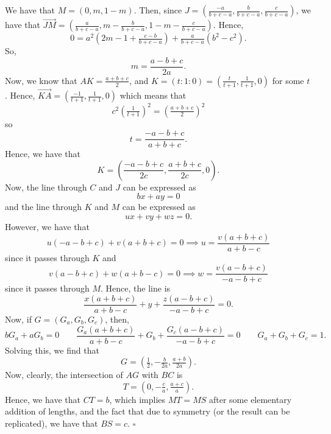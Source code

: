 \documentclass{article}
\begin{document}
We have that $M = (0, m, 1-m)$. Then, since $J = \left(\tfrac{-a}{b+c-a}, \tfrac{b}{b+c-a}, \tfrac{c}{b+c-a}\right)$, we have that $\overrightarrow{JM} = \left(\tfrac{a}{b+c-a}, m-\tfrac{b}{b+c-a}, 1-m-\tfrac{c}{b+c-a}\right)$. Hence, \[0 = a^2\left(2m-1+\tfrac{c-b}{b+c-a}\right)+\tfrac{a}{b+c-a}(b^2-c^2).\] So, \[m = \dfrac{a-b+c}{2a}.\] Now, we know that $AK = \tfrac{a+b+c}{2}$, and $K = (t : 1 : 0) = \left(\tfrac{t}{t+1}, \tfrac{1}{t+1}, 0\right)$ for some $t$. Hence, $\overrightarrow{KA} = \left(\tfrac{-1}{t+1}, \tfrac{1}{t+1}, 0\right)$ which means that \[c^2\left(\tfrac{1}{t+1}\right)^2 = \left(\tfrac{a+b+c}{2}\right)^2\] so \[t = \dfrac{-a-b+c}{a+b+c}.\] Hence, we have that \[K = \left(\dfrac{-a-b+c}{2c}, \dfrac{a+b+c}{2c}, 0\right).\] Now, the line through $C$ and $J$ can be expressed as \[bx+ay = 0\] and the line through $K$ and $M$ can be expressed as \[ux+vy+wz = 0.\] However, we have that \[u(-a-b+c)+v(a+b+c) = 0 \implies u = \dfrac{v(a+b+c)}{a+b-c}\] since it passes through $K$ and \[v(a-b+c)+w(a+b-c) = 0 \implies w = \dfrac{v(a-b+c)}{-a-b+c}\] since it passes through $M$. Hence, the line is \[\dfrac{x(a+b+c)}{a+b-c}+y+\dfrac{z(a-b+c)}{-a-b+c} = 0.\] Now, if $G = (G_a, G_b, G_c)$, then, \[bG_a+aG_b = 0 \qquad \dfrac{G_a(a+b+c)}{a+b-c}+G_b+\dfrac{G_c(a-b+c)}{-a-b+c} = 0 \qquad G_a+G_b+G_c = 1.\] Solving this, we find that \[G = \left(\tfrac{1}{2}, -\tfrac{b}{2a}, \tfrac{a+b}{2a}\right).\] Now, clearly, the intersection of $AG$ with $BC$ is \[T = \left(0, -\tfrac{c}{a}, \tfrac{a+c}{a}\right).\] Hence, we have that $CT = b$, which implies $MT=MS$ after some elementary addition of lengths, and the fact that due to symmetry (or the result can be replicated), we have that $BS = c$. $\square$
\end{document}
